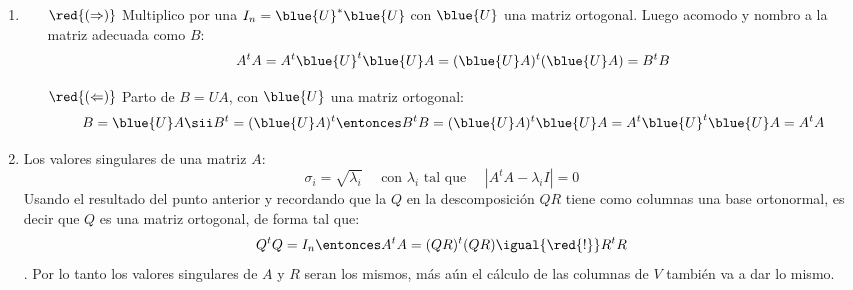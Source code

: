 \begin{enumerate}[label=(\alph*)]
  \item
        \begin{itemize}
          \item[$\red{(\Rightarrow)}$]
                Multiplico por una $I_n = \blue{U}^* \blue{U}$ con $\blue{U}$ una matriz ortogonal. Luego acomodo y nombro a la matriz adecuada como $B$:
                $$
                  A^tA =
                  A^t \blue{U}^t \blue{U} A =
                  (\blue{U}A)^t (\blue{U} A) =
                  B^t B
                $$

          \item[$\red{(\Leftarrow)}$]
                Parto de $B = UA$, con $\blue{U}$ una matriz ortogonal:
                $$
                  B = \blue{U}A \sii B^t = (\blue{U}A)^t
                  \entonces
                  B^tB =
                  (\blue{U}A)^t \blue{U}A =
                  A^t\blue{U}^t \blue{U}A =
                  A^t A
                $$
        \end{itemize}

  \item Los valores singulares de una matriz $A$:
        $$
          \sigma_i = \sqrt{\lambda_i} \quad \text{ con $\lambda_i$ tal que }\quad |A^tA - \lambda_iI| = 0
        $$
        Usando el resultado del punto anterior y recordando que la $Q$ en la descomposición $QR$
        tiene como columnas una base ortonormal, es decir que $Q$ es una matriz ortogonal, de forma tal que:
        $$
          Q^t Q = I_n
          \entonces
          A^tA =
          (Q R)^t (Q R) \igual{\red{!}}
          R^t R
        $$.
        Por lo tanto los valores singulares de $A$ y $R$ seran los mismos, más aún el cálculo de las columnas de $V$ también va a dar lo mismo.


\end{enumerate}
